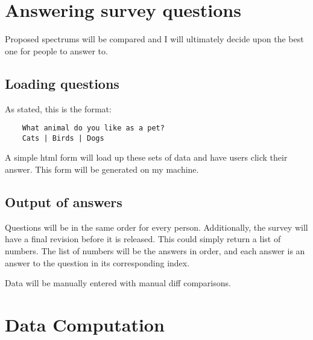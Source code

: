 \documentclass[12pt]{article}
\begin{document}
\section{Answering survey questions}
Proposed spectrums will be compared and I will ultimately decide upon the best one for people to answer to.

\subsection{Loading questions}
As stated, this is the format:
\begin{verbatim}
    What animal do you like as a pet?
    Cats | Birds | Dogs
\end{verbatim}

A simple html form will load up these sets of data and have users click their answer.
This form will be generated on my machine.

\subsection{Output of answers}
Questions will be in the same order for every person. Additionally, the survey will have a final revision before it is released. This could simply return a list of numbers. The list of numbers will be the answers in order, and each answer is an answer to the question in its corresponding index.

Data will be manually entered with manual diff comparisons.

\section{Data Computation}
\end{document}
